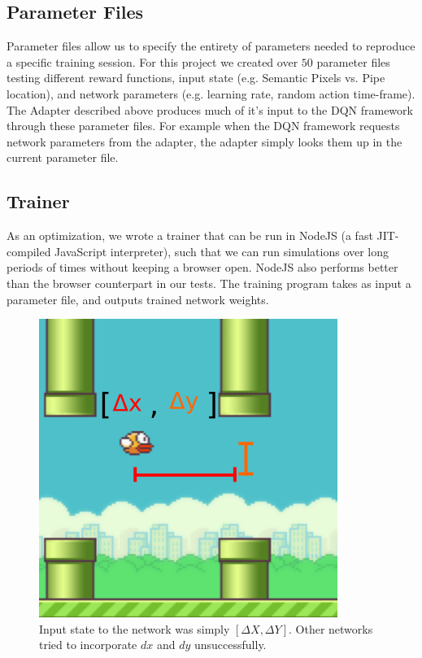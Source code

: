 \documentclass{chi2009}
\begin{document}
\subsection{Parameter Files}

Parameter files allow us to specify the entirety of parameters needed to reproduce a specific training session. For this project we created over $50$ parameter files testing different reward functions, input state (e.g. Semantic Pixels vs. Pipe location), and network parameters (e.g. learning rate, random action time-frame). The Adapter described above produces much of it's input to the DQN framework through these parameter files. For example when the DQN framework requests network parameters from the adapter, the adapter simply looks them up in the current parameter file.

\subsection{Trainer}

As an optimization, we wrote a trainer that can be run in NodeJS (a fast JIT-compiled JavaScript interpreter), such that we can run simulations over long periods of times without keeping a browser open. NodeJS also performs better than the browser counterpart in our tests. The training program takes as input a parameter file, and outputs trained network weights.

\begin{figure}[t]
\begin{center}
\includegraphics[width=0.8\columnwidth]{figs/state.png}
\vspace*{-0.05in}
\caption{Input state to the network was simply $\left[\Delta X, \Delta Y \right]$. Other networks tried to incorporate $dx$ and $dy$ unsuccessfully.}
\label{fig:state}
\end{center}
\end{figure}
\end{document}
